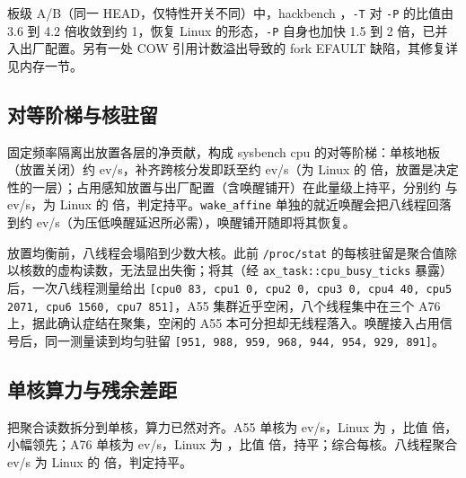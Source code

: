 板级 A/B（同一 HEAD，仅特性开关不同）中，hackbench ，\texttt{-T} 对 \texttt{-P} 的比值由 3.6 到 4.2 倍收敛到约 1，恢复 Linux 的形态，\texttt{-P} 自身也加快 1.5 到 2 倍，已并入出厂配置。另有一处 COW 引用计数溢出导致的 fork EFAULT 缺陷，其修复详见内存一节。

\subsection{对等阶梯与核驻留}

固定频率隔离出放置各层的净贡献，构成 sysbench cpu 的对等阶梯：单核地板（放置关闭）约 \nLadderFloor{} ev/s，补齐跨核分发即跃至约 \nLadderPlace{} ev/s（为 Linux 的 \nCpuTEightRatio{} 倍，放置是决定性的一层）；占用感知放置与出厂配置（含唤醒铺开）在此量级上持平，分别约 \nLadderOcc{} 与 \nCpuTEight{} ev/s，为 Linux \nCpuTEightLin{} 的 \nCpuTEightRatio{} 倍，判定持平。\texttt{wake\_affine} 单独的就近唤醒会把八线程回落到约 \nLadderCoalesce{} ev/s（为压低唤醒延迟所必需），唤醒铺开随即将其恢复。


放置均衡前，八线程会塌陷到少数大核。此前 \texttt{/proc/stat} 的每核驻留是聚合值除以核数的虚构读数，无法显出失衡；将其（经 \texttt{ax\_task::cpu\_busy\_ticks} 暴露）后，一次八线程测量给出 \texttt{[cpu0 83, cpu1 0, cpu2 0, cpu3 0, cpu4 40, cpu5 2071, cpu6 1560, cpu7 851]}，A55 集群近乎空闲，八个线程集中在三个 A76 上，据此确认症结在聚集，空闲的 A55 本可分担却无线程落入。唤醒接入占用信号后，同一测量读到均匀驻留 \texttt{[951, 988, 959, 968, 944, 954, 929, 891]}。


\subsection{单核算力与残余差距}

把聚合读数拆分到单核，算力已然对齐。A55 单核为 \nAfive{} ev/s，Linux 为 \nAfiveLin{}，比值 \nAfiveRatio{} 倍，小幅领先；A76 单核为 \nAseven{} ev/s，Linux 为 \nAsevenLin{}，比值 \nAsevenRatio{} 倍，持平；综合每核。八线程聚合 \nCpuTEight{} ev/s 为 Linux \nCpuTEightLin{} 的 \nCpuTEightRatio{} 倍，判定持平。

